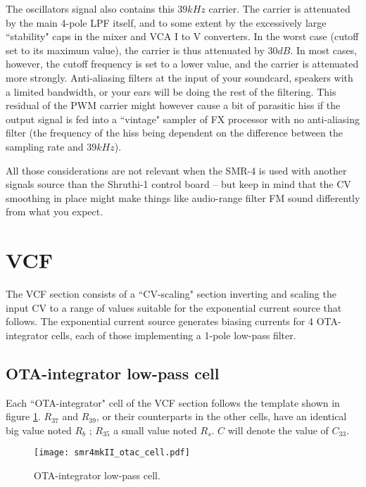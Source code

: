 \documentclass[a4paper,11pt]{article}
\begin{document}
The oscillators signal also contains this $39kHz$ carrier. The carrier is attenuated by the main 4-pole LPF itself, and to some extent by the excessively large ``stability" caps in the mixer and VCA I to V converters. In the worst case (cutoff set to its maximum value), the carrier is thus attenuated by $30dB$. In most cases, however, the cutoff frequency is set to a lower value, and the carrier is attenuated more strongly. Anti-aliasing filters at the input of your soundcard, speakers with a limited bandwidth, or your ears will be doing the rest of the filtering. This residual of the PWM carrier might however cause a bit of parasitic hiss if the output signal is fed into a ``vintage" sampler of FX processor with no anti-aliasing filter (the frequency of the hiss being dependent on the difference between the sampling rate and $39kHz$).

All those considerations are not relevant when the SMR-4 is used with another signals source than the Shruthi-1 control board -- but keep in mind that the CV smoothing in place might make things like audio-range filter FM sound differently from what you expect.

\section{VCF}
\label{sec:vcf}

The VCF section consists of a ``CV-scaling" section inverting and scaling the input CV to a range of values suitable for the exponential current source that follows. The exponential current source generates biasing currents for 4 OTA-integrator cells, each of those implementing a 1-pole low-pass filter.

\subsection{OTA-integrator low-pass cell}
\label{sec:otac}

Each ``OTA-integrator" cell of the VCF section follows the template shown in figure \ref{fig:otac}. $R_{37}$ and $R_{39}$, or their counterparts in the other cells, have an identical big value noted $R_b$ ; $R_{35}$ a small value noted $R_s$. $C$ will denote the value of $C_{33}$.

\begin{figure}
\centering
\texttt{[image: smr4mkII\_otac\_cell.pdf]}
\caption{OTA-integrator low-pass cell.}
\label{fig:otac}
\end{figure}
\end{document}
